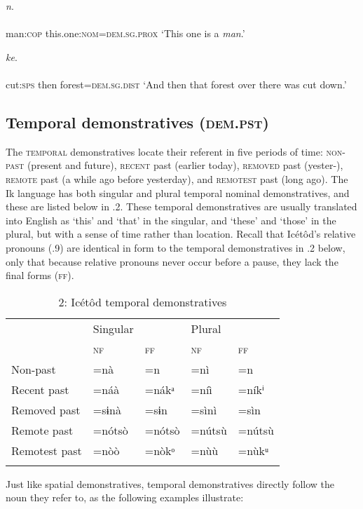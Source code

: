 \ea\label{ex:}
 \textit{n}. \\
    \\
man:\textsc{cop}  this.one:\textsc{nom}=\textsc{dem.sg.prox}
\glt ‘This one is a \textit{man}.’ 
\z




\ea\label{ex:}
 \textit{ke}. \\
    \\
cut:\textsc{sps}   then   forest=\textsc{dem.sg.dist}
\glt ‘And then that forest over there was cut down.’ 
\z






\subsection{Temporal demonstratives (\textsc{dem.pst})}


The \textsc{temporal} demonstratives locate their referent in five periods of time: \textsc{non-past} (present and future), \textsc{recent} past (earlier today), \textsc{removed} past (yester-), \textsc{remote} past (a while ago before yesterday), and \textsc{remotest} past (long ago). The Ik language has both singular and plural temporal nominal demonstratives, and these are listed below in .2. These temporal demonstratives are usually translated into English as ‘this’ and ‘that’ in the singular, and ‘these’ and ‘those’ in the plural, but with a sense of time rather than location. Recall that Icétôd’s relative pronouns (.9) are identical in form to the temporal demonstratives in .2 below, only that because relative pronouns never occur before a pause, they lack the final forms (\textsc{ff}).


\begin{table}
\caption{2: Icétôd temporal demonstratives}
\label{tab:6}


\begin{tabularx}{\textwidth}{XXXXX} & Singular &  & Plural & \\
\lsptoprule
& \textsc{nf} & \textsc{ff} & \textsc{nf} & \textsc{ff}\\
Non-past & =nà & =n & =nì & =n\\
Recent past & =náà & =nákᵃ & =níì & =níkⁱ\\
Removed past & =sɨnà & =sɨn & =sìnì & =sìn\\
Remote past & =nótsò & =nótsò & =nútsù & =nútsù\\
Remotest past & =nòò & =nòkᵒ & =nùù & =nùkᵘ\\
\lspbottomrule
\end{tabularx}
\end{table}
Just like spatial demonstratives, temporal demonstratives directly follow the noun they refer to, as the following examples illustrate:




